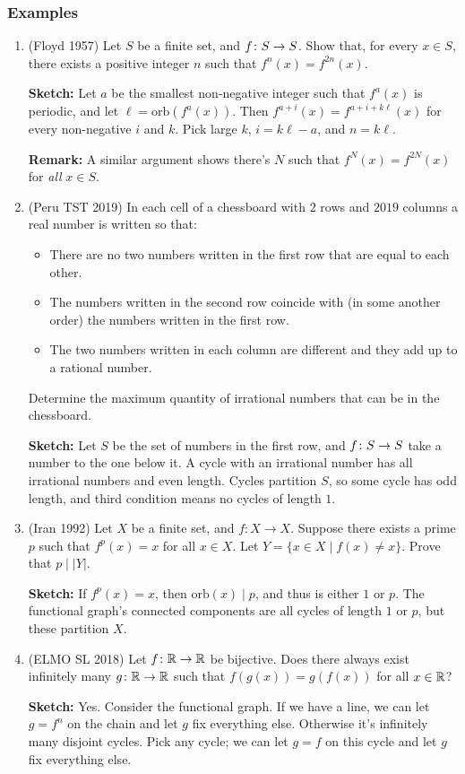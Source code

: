 \documentclass[11pt,paper=letter]{scrartcl}
\newcommand{\orb}[1]{\mathrm{orb}(#1)}
\begin{document}
\subsubsection*{Examples}

\begin{enumerate}
\item (Floyd 1957) Let $S$ be a finite set, and $f \colon S \to S$. Show that, for every $x \in S$, there exists a positive integer $n$ such that $f^n(x) = f^{2n}(x)$.

\textbf{Sketch:} Let $a$ be the smallest non-negative integer such that $f^a(x)$ is periodic, and let $\ell = \orb{f^a(x)}$. Then $f^{a + i}(x) = f^{a + i + k\ell}(x)$ for every non-negative $i$ and $k$. Pick large $k$, $i = k\ell - a$, and $n = k\ell$.

\textbf{Remark:} A similar argument shows there's $N$ such that $f^N(x) = f^{2N}(x)$ for \textit{all} $x \in S$.

\item (Peru TST 2019) In each cell of a chessboard with $2$ rows and $2019$ columns a real number is written so that:
\begin{itemize}
\item There are no two numbers written in the first row that are equal to each other.
\item The numbers written in the second row coincide with (in some another order) the numbers written in the first row.
\item The two numbers written in each column are different and they add up to a rational number.
\end{itemize}
Determine the maximum quantity of irrational numbers that can be in the chessboard.

\textbf{Sketch:} Let $S$ be the set of numbers in the first row, and $f \colon S \to S$ take a number to the one below it. A cycle with an irrational number has all irrational numbers and even length. Cycles partition $S$, so some cycle has odd length, and third condition means no cycles of length $1$.

\item (Iran 1992) Let $X$ be a finite set, and $f: X \to X$. Suppose there exists a prime $p$ such that $f^p(x) = x$ for all $x \in X$. Let $Y = \{x \in X \mid f(x) \neq x\}$. Prove that $p \mid |Y|$.

\textbf{Sketch:} If $f^p(x) = x$, then $\orb{x} \mid p$, and thus is either $1$ or $p$. The functional graph's connected components are all cycles of length $1$ or $p$, but these partition $X$.

\item (ELMO SL 2018) Let $f \colon \mathbb R \to \mathbb R$ be bijective. Does there always exist infinitely many $g \colon \mathbb R \to \mathbb R$ such that $f(g(x)) = g(f(x))$ for all $x \in \mathbb R$?

\textbf{Sketch:} Yes. Consider the functional graph. If we have a line, we can let $g = f^n$ on the chain and let $g$ fix everything else. Otherwise it's infinitely many disjoint cycles. Pick any cycle; we can let $g = f$ on this cycle and let $g$ fix everything else.
\end{enumerate}
\end{document}
